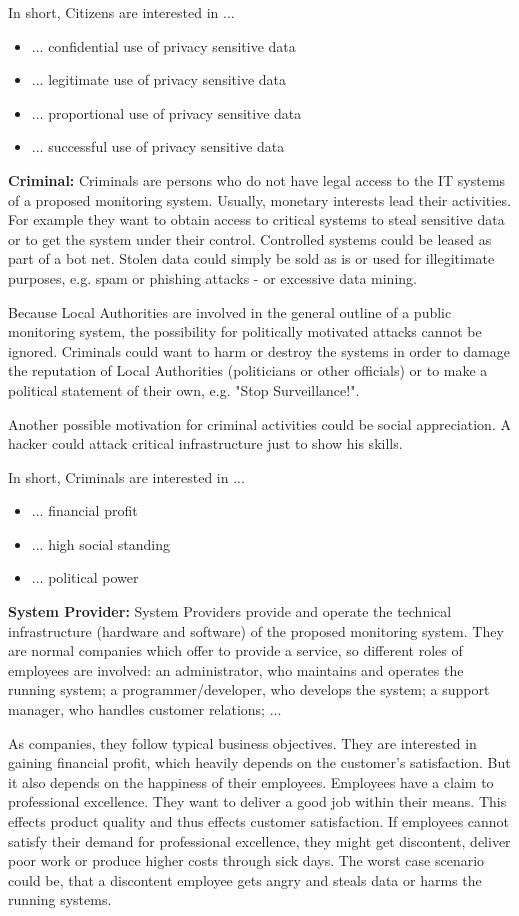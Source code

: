 In short, Citizens are interested in ...
\begin{itemize}
\item ... confidential use of privacy sensitive data
\item ... legitimate use of privacy sensitive data
\item ... proportional use of privacy sensitive data
\item ... successful use of privacy sensitive data
\end{itemize}

\textbf{Criminal:}
Criminals are persons who do not have legal access to the IT systems of a proposed monitoring system.
Usually, monetary interests lead their activities.
For example they want to obtain access to critical systems to steal sensitive data or to get the system under their control.
Controlled systems could be leased as part of a bot net. 
Stolen data could simply be sold as is or used for illegitimate purposes, e.g. spam or phishing attacks - or excessive data mining.  

Because Local Authorities are involved in the general outline of a public monitoring system, the possibility for politically motivated attacks cannot be ignored. 
Criminals could want to harm or destroy the systems in order to damage the reputation of Local Authorities (politicians or other officials) or to make a political statement of their own, e.g. "Stop Surveillance!".

Another possible motivation for criminal activities could be social appreciation.
A hacker could attack critical infrastructure just to show his skills.

In short, Criminals are interested in ...
\begin{itemize}
\item ... financial profit
\item ... high social standing
\item ... political power
\end{itemize}

\textbf{System Provider:}
System Providers provide and operate the technical infrastructure (hardware and software) of the proposed monitoring system.
They are normal companies which offer to provide a service, so different roles of employees are involved:
an administrator, who maintains and operates the running system;
a programmer/developer, who develops the system;
a support manager, who handles customer relations;
...

As companies, they follow typical business objectives. 
They are interested in gaining financial profit, which heavily depends on the customer's satisfaction.
But it also depends on the happiness of their employees. 
Employees have a claim to professional excellence.
They want to deliver a good job within their means.
This effects product quality and thus effects customer satisfaction.
If employees cannot satisfy their demand for professional excellence, they might get discontent, deliver poor work or produce higher costs through sick days.
The worst case scenario could be, that a discontent employee gets angry and steals data or harms the running systems.




